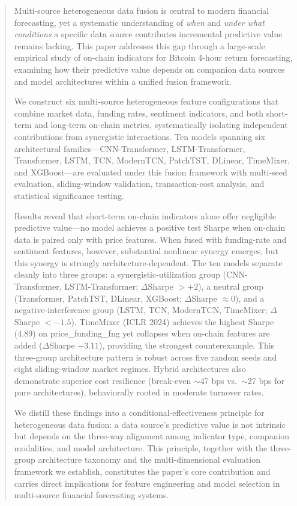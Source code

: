 \documentclass[a4paper]{cas-dc}
\begin{document}
\begin{abstract}
Multi-source heterogeneous data fusion is central to modern financial forecasting, yet a systematic understanding of \textit{when} and \textit{under what conditions} a specific data source contributes incremental predictive value remains lacking. This paper addresses this gap through a large-scale empirical study of on-chain indicators for Bitcoin 4-hour return forecasting, examining how their predictive value depends on companion data sources and model architectures within a unified fusion framework.

We construct six multi-source heterogeneous feature configurations that combine market data, funding rates, sentiment indicators, and both short-term and long-term on-chain metrics, systematically isolating independent contributions from synergistic interactions. Ten models spanning six architectural families---CNN-Transformer, LSTM-Transformer, Transformer, LSTM, TCN, ModernTCN, PatchTST, DLinear, TimeMixer, and XGBoost---are evaluated under this fusion framework with multi-seed evaluation, sliding-window validation, transaction-cost analysis, and statistical significance testing.

Results reveal that short-term on-chain indicators alone offer negligible predictive value---no model achieves a positive test Sharpe when on-chain data is paired only with price features. When fused with funding-rate and sentiment features, however, substantial nonlinear synergy emerges, but this synergy is strongly architecture-dependent. The ten models separate cleanly into three groups: a synergistic-utilization group (CNN-Transformer, LSTM-Transformer; $\Delta$Sharpe $>+2$), a neutral group (Transformer, PatchTST, DLinear, XGBoost; $\Delta$Sharpe $\approx 0$), and a negative-interference group (LSTM, TCN, ModernTCN, TimeMixer; $\Delta$Sharpe $<-1.5$). TimeMixer (ICLR 2024) achieves the highest Sharpe (4.89) on price\_funding\_fng yet collapses when on-chain features are added ($\Delta$Sharpe $-3.11$), providing the strongest counterexample. This three-group architecture pattern is robust across five random seeds and eight sliding-window market regimes. Hybrid architectures also demonstrate superior cost resilience (break-even $\sim$47 bps vs.\ $\sim$27 bps for pure architectures), behaviorally rooted in moderate turnover rates.

We distill these findings into a conditional-effectiveness principle for heterogeneous data fusion: a data source's predictive value is not intrinsic but depends on the three-way alignment among indicator type, companion modalities, and model architecture. This principle, together with the three-group architecture taxonomy and the multi-dimensional evaluation framework we establish, constitutes the paper's core contribution and carries direct implications for feature engineering and model selection in multi-source financial forecasting systems.
\end{abstract}
\end{document}
